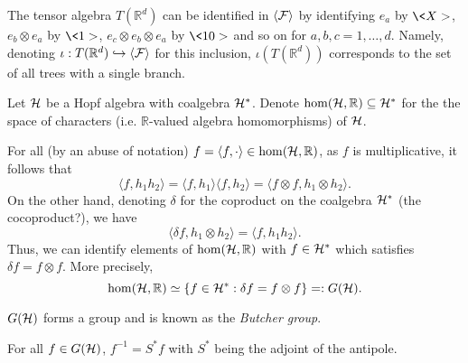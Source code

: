 \documentclass[11pt]{style/preprint}
\begin{document}
The tensor algebra \(T(\mathbb{R}^d)\) can be identified in \(\langle {\mathcal F} \rangle\) by identifying 
\(e_a\) by \(\<X>\), \(e_b \otimes e_a\) by \(\<1>\), \(e_c \otimes e_b \otimes e_a\) by \(\<10>\)
and so on for \(a, b, c = 1, \dots, d\). Namely, denoting 
\(\iota : T(\mathbb{R}^d) \hookrightarrow \langle {\mathcal F} \rangle\) for this inclusion, 
\(\iota(T(\mathbb{R}^d))\) corresponds to the set of all trees with a single branch.

\begin{definition}
  Let \({\mathcal H}\) be a Hopf algebra with coalgebra \({\mathcal H}^*\). Denote \(\hom({\mathcal H}, \mathbb{R}) \subseteq {\mathcal H}^*\) 
  for the the space of characters (i.e. \(\mathbb{R}\)-valued algebra homomorphisms) of \({\mathcal H}\).
\end{definition}

For all (by an abuse of notation) \(f = \langle f, \cdot \rangle \in \hom({\mathcal H}, \mathbb{R})\), 
as \(f\) is multiplicative, it follows that 
\[\langle f, h_1 h_2\rangle = \langle f, h_1\rangle \langle f, h_2\rangle = 
  \langle f \otimes f, h_1 \otimes h_2\rangle.\]
On the other hand, denoting \(\delta\) for the coproduct on the coalgebra \({\mathcal H}^*\) (the cocoproduct?), we have 
\[\langle \delta f, h_1 \otimes h_2\rangle = \langle f, h_1 h_2\rangle.\] 
Thus, we can identify elements of \(\hom({\mathcal H}, \mathbb{R})\) with \(f \in {\mathcal H}^*\) which satisfies 
\(\delta f = f \otimes f\). More precisely, 
\[\hom({\mathcal H}, \mathbb{R}) \simeq \{f \in {\mathcal H}^* : \delta f = f \otimes f\} =: G({\mathcal H}).\]

\begin{definition}
  \(G({\mathcal H})\) forms a group and is known as the \textit{Butcher group}.
\end{definition}

\begin{proposition}
  For all \(f \in G({\mathcal H})\), \(f^{-1} = S^* f\) with \(S^*\) being the adjoint of the antipole.
\end{proposition}
\end{document}
